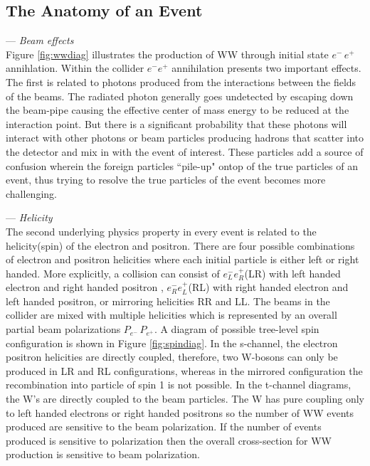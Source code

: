 \subsection{The Anatomy of an Event}
\label{subsec:collphsx}
--- \textit{Beam effects}\\
Figure \ref{fig:wwdiag} illustrates the production of WW through initial state $e^- \, e^+$ annihlation. Within the collider $e^- e^+$ annihilation presents two important effects. The first is related to photons produced from the interactions between the fields of the beams. The radiated photon generally goes undetected by escaping down the beam-pipe causing the effective center of mass energy to be reduced at the interaction point. But there is a significant probability that these photons will interact with other photons or beam particles producing hadrons that scatter into the detector and mix in with the event of interest. These particles add a source of confusion wherein the foreign particles ``pile-up"  ontop of the true particles of an event, thus  trying to resolve the true particles of the event becomes more challenging. 

--- \textit{Helicity}\\
The second underlying physics property in every event is related to the helicity(spin) of the electron and positron. There are four possible combinations of electron and positron helicities where each initial particle is either left or right handed. More explicitly, a collision can consist of  $e^-_L e^+_R$(LR) with left handed electron and right handed positron , $e^-_R e^+_L$(RL)  with right handed electron and left handed positron, or mirroring helicities RR and LL.  The beams in the collider are mixed with multiple helicities which is represented by an overall partial beam polarizations $P_{e^-} \, P_{e^+}$. A diagram of possible tree-level spin configuration is shown in Figure \ref{fig:spindiag}. In the s-channel, the electron positron helicities  are directly coupled, therefore, two W-bosons can only be produced in LR and RL configurations, whereas in the mirrored configuration the  recombination into particle of spin 1 is  not possible. In the t-channel diagrams, the W's are directly coupled to the beam particles. The W has pure coupling only to left handed electrons or right handed positrons so the number of  WW events produced are sensitive to the beam polarization\cite{thomson}.  If the number of events produced is sensitive to polarization then the overall cross-section for WW production is sensitive to beam polarization. 

